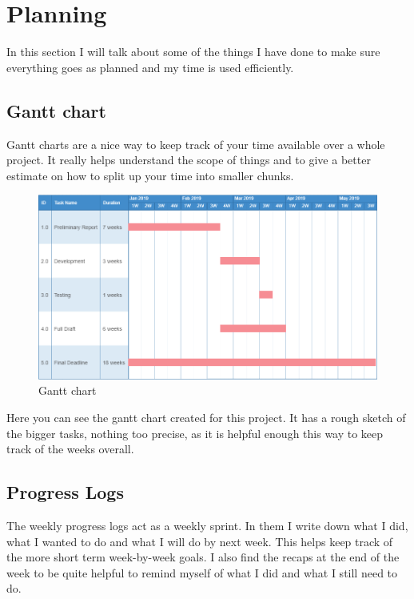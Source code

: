 

\chapter{Planning}

\label{Chapter4}

In this section I will talk about some of the things I have done to make sure everything goes as planned and my time is used efficiently. 

\section{Gantt chart}
Gantt charts are a nice way to keep track of your time available over a whole project. It really helps understand the scope of things and to give a better estimate on how to split up your time into smaller chunks.
\begin{figure}[!h]
\includegraphics[width=150mm]{figures/gantt_chart}
\caption{Gantt chart}
\end{figure}

Here you can see the gantt chart created for this project. It has a rough sketch of the bigger tasks, nothing too precise, as it is helpful enough this way to keep track of the weeks overall.

\section{Progress Logs}
The weekly progress logs act as a weekly sprint. In them I write down what I did, what I wanted to do and what I will do by next week. This helps keep track of the more short term week-by-week goals. I also find the recaps at the end of the week to be quite helpful to remind myself of what I did and what I still need to do. 

